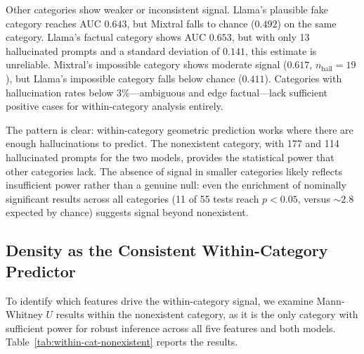 Other categories show weaker or inconsistent signal. Llama's plausible fake category reaches AUC $0.643$, but Mixtral falls to chance ($0.492$) on the same category. Llama's factual category shows AUC $0.653$, but with only 13 hallucinated prompts and a standard deviation of $0.141$, this estimate is unreliable. Mixtral's impossible category shows moderate signal ($0.617$, $n_{\text{hall}} = 19$), but Llama's impossible category falls below chance ($0.411$). Categories with hallucination rates below 3\%---ambiguous and edge factual---lack sufficient positive cases for within-category analysis entirely.

The pattern is clear: within-category geometric prediction works where there are enough hallucinations to predict. The nonexistent category, with 177 and 114 hallucinated prompts for the two models, provides the statistical power that other categories lack. The absence of signal in smaller categories likely reflects insufficient power rather than a genuine null: even the enrichment of nominally significant results across all categories (11 of 55 tests reach $p < 0.05$, versus ${\sim}2.8$ expected by chance) suggests signal beyond nonexistent.

\subsection{Density as the Consistent Within-Category Predictor}
\label{sec:within-cat-density}

To identify which features drive the within-category signal, we examine Mann-Whitney $U$ results within the nonexistent category, as it is the only category with sufficient power for robust inference across all five features and both models. Table~\ref{tab:within-cat-nonexistent} reports the results.

